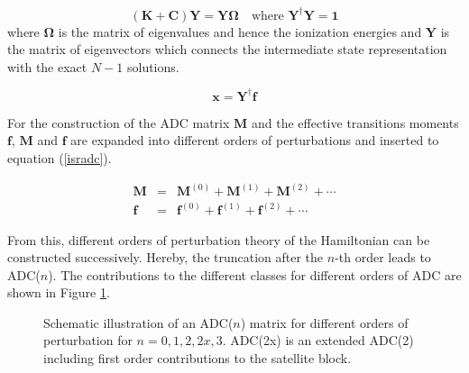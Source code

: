 \begin{equation}\label{adcewp}
(\mathbf{K}+\mathbf{C}) \mathbf{Y} = \mathbf{Y}\mathbf{\Omega} \quad\text{where } \mathbf{Y}^\dagger\mathbf{Y}=\mathbf{1}
\end{equation}
where $\mathbf{\Omega}$ is the matrix of eigenvalues and hence the ionization
energies and $\mathbf{Y}$ is the matrix of eigenvectors which connects the
intermediate state representation with the exact $N-1$ solutions.

\begin{equation}
 \mathbf{x} = \mathbf{Y}^\dagger \mathbf{f}
\end{equation}

For the construction of the \ac{ADC} matrix $\mathbf{M}$ and the
effective transitions moments $\mathbf{f}$, $\mathbf{M}$ and $\mathbf{f}$
are expanded into different orders of perturbations and inserted to equation
(\ref{isradc}).

\begin{eqnarray}
\mathbf{M} &=& \mathbf{M}^{(0)} + \mathbf{M}^{(1)} + \mathbf{M}^{(2)} + \cdots\label{stf}\\
\mathbf{f} &=& \mathbf{f}^{(0)} + \mathbf{f}^{(1)} + \mathbf{f}^{(2)} + \cdots\label{stf}
\end{eqnarray}

From this, different orders of perturbation theory of the Hamiltonian can be
constructed successively. Hereby, the truncation after the $n$-th order leads
to ADC($n$). The contributions to the different classes for different
orders of \ac{ADC} are shown
in Figure \ref{figure:adcmat_pgf}.

\begin{figure}[h]
  \centering
  
  \caption{Schematic illustration of an \ac{ADC}($n$) matrix for different orders
           of perturbation for $n=0,1,2,2x,3$. ADC(2x) is an extended ADC(2)
           including first
           order contributions to the satellite block.}
  \label{figure:adcmat_pgf}
\end{figure}


